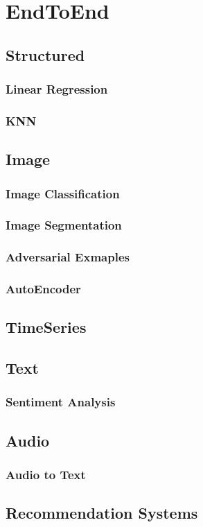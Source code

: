 \chapter{EndToEnd}

\section{Structured}

\subsection{Linear Regression}

\subsection{KNN}

\section{Image}

\subsection{Image Classification}

\subsection{Image Segmentation}

\subsection{Adversarial Exmaples}

\subsection{AutoEncoder}


\section{TimeSeries}

\section{Text}

\subsection{Sentiment Analysis}

\section{Audio}

\subsection{Audio to Text}

\section{Recommendation Systems}

